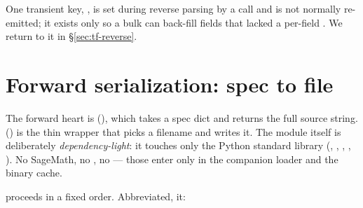One transient key, , is set during reverse parsing
by a  call and is not normally re-emitted; it exists only
so a bulk  can back-fill fields that lacked a per-field
. We return to it in \S\ref{sec:tf-reverse}.

\section{Forward serialization: spec to file}\label{sec:tf-forward}

The forward heart is 
(), which takes a spec dict and returns
the full  source string. 
() is the thin wrapper that picks a filename and writes it. The
module itself is deliberately \emph{dependency-light}: it touches only the Python
standard library (, , , , ).
No SageMath, no , no  --- those enter only in the
companion loader and the binary cache.

 proceeds in a fixed order. Abbreviated, it:


